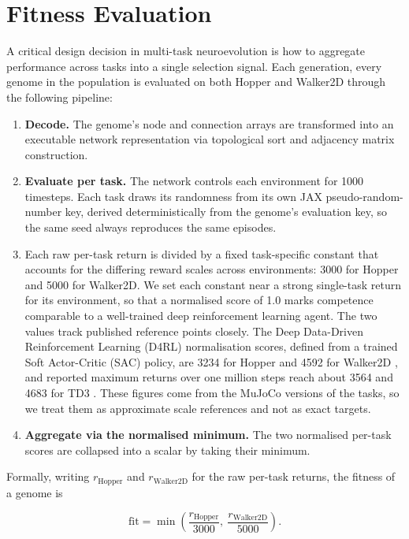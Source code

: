 \section{Fitness Evaluation}
\label{subsec:fitness-evaluation}

A critical design decision in multi-task neuroevolution is how to aggregate performance across tasks into a single selection signal.
Each generation, every genome in the population is evaluated on both Hopper and Walker2D through the following pipeline:

\begin{enumerate}
    \item \textbf{Decode.} The genome's node and connection arrays are transformed into an executable network representation via topological sort and adjacency matrix construction.
    \item \textbf{Evaluate per task.} The network controls each environment for 1000 timesteps. Each task draws its randomness from its own JAX pseudo-random-number key, derived deterministically from the genome's evaluation key, so the same seed always reproduces the same episodes.
    \item \textbf{} Each raw per-task return is divided by a fixed task-specific constant that accounts for the differing reward scales across environments: 3000 for Hopper and 5000 for Walker2D. We set each constant near a strong single-task return for its environment, so that a normalised score of 1.0 marks competence comparable to a well-trained deep reinforcement learning agent. The two values track published reference points closely. The Deep Data-Driven Reinforcement
Learning (D4RL) normalisation scores, defined from a trained Soft Actor-Critic (SAC) policy, are 3234 for Hopper and 4592 for Walker2D \parencite{fu_d4rl_2020,haarnoja_soft_2018}, and reported maximum returns over one million steps reach about 3564 and 4683 for TD3 \parencite{fujimoto_addressing_2018}. These figures come from the MuJoCo versions of the tasks, so we treat them as approximate scale references and not as exact targets.
    \item \textbf{Aggregate via the normalised minimum.} The two normalised per-task scores are collapsed into a scalar by taking their minimum.
\end{enumerate}

Formally, writing $r_{\text{Hopper}}$ and $r_{\text{Walker2D}}$ for the raw per-task returns, the fitness of a genome is

\[\text{fit} = \min\!\left(\frac{r_{\text{Hopper}}}{3000},\ \frac{r_{\text{Walker2D}}}{5000}\right).\]

